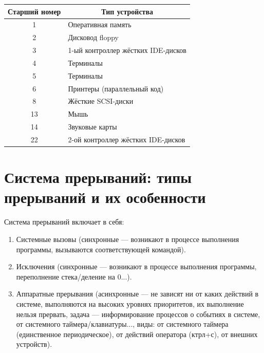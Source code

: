 \begin{table}[H]
\begin{center}
\begin{tabular}{|c|l|}
\hline
Старший номер & \multicolumn{1}{c|}{Тип устройства} \\ \hline
1             & Оперативная память                  \\ \hline
2             & Дисковод floppy                     \\ \hline
3             & 1-ый контроллер жёстких IDE-дисков  \\ \hline
4             & Терминалы                           \\ \hline
5             & Терминалы                           \\ \hline
6             & Принтеры (параллельный код)         \\ \hline
8             & Жёсткие SCSI-диски                  \\ \hline
13            & Мышь                                \\ \hline
14            & Звуковые карты                      \\ \hline
22            & 2-ой контроллер жёстких IDE-дисков  \\ \hline
\end{tabular}
\end{center}
\end{table}

\newpage

\section{Система прерываний: типы прерываний и их особенности}

Система прерываний включает в себя:
\begin{enumerate}
	\item Системные вызовы (синхронные --- возникают в процессе выполнения программы, вызываются соответствующей командой).
	\item Исключения (синхронные --- возникают в процессе выполнения программы, переполнение стека/деление на 0...).
	\item Аппаратные прерывания (асинхронные --- не зависят ни от каких действий в системе, выполняются на высоких уровнях приоритетов, их выполнение нельзя прервать, задача --- информирование процессов о событиях в системе, от системного таймера/клавиатуры..., виды: от системного таймера (единственное периодическое), от действий оператора (ктрл+с), от внешних устройств).
\end{enumerate}

